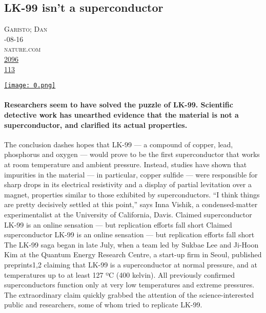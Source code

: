 \documentclass[10pt,a4paper]{article}
\begin{document}
\subsection{LK-99 isn’t a superconductor}
\noindent\begin{minipage}[t]{0.20\linewidth}
\vspace{0pt}
\noindent\textsc{\footnotesize
{\scriptsize\faUser}\space 
Garisto; Dan \\
{\scriptsize\faCalendar}-08-16 \\
{\scriptsize\faGlobe}\space 
nature.com \\
{\scriptsize\faThumbsOUp}\space 
\href{http://news.ycombinator.com/item?id=37149349\&utm\_term=comment}{2096} \\
{\scriptsize\faComments}\space 
\href{http://news.ycombinator.com/item?id=37149349\&utm\_term=comment}{113} \\
}
\end{minipage} %
\begin{minipage}[t]{0.80\linewidth}
\vspace{0pt}
\begin{multicols}{2}

    \href{https://www.nature.com/articles/d41586-023-02585-7?utm\_source=hackernewsletter\&utm\_medium=email\&utm\_term=fav}{
        \texttt{[image: 0.png]}
    }
  
\paragraph{Researchers seem to have solved the puzzle of LK-99. Scientific detective work has unearthed evidence that the material is not a superconductor, and clarified its actual properties.}

The conclusion dashes hopes that LK-99 — a compound of copper, lead, phosphorus and oxygen — would prove to be the first superconductor that works at room temperature and ambient pressure. Instead, studies have shown that impurities in the material — in particular, copper sulfide — were responsible for sharp drops in its electrical resistivity and a display of partial levitation over a magnet, properties similar to those exhibited by superconductors.
“I think things are pretty decisively settled at this point,” says Inna Vishik, a condensed-matter experimentalist at the University of California, Davis.
Claimed superconductor LK-99 is an online sensation — but replication efforts fall short
Claimed superconductor LK-99 is an online sensation — but replication efforts fall short
The LK-99 saga began in late July, when a team led by Sukbae Lee and Ji-Hoon Kim at the Quantum Energy Research Centre, a start-up firm in Seoul, published preprints1,2 claiming that LK-99 is a superconductor at normal pressure, and at temperatures up to at least 127 ºC (400 kelvin). All previously confirmed superconductors function only at very low temperatures and extreme pressures.
The extraordinary claim quickly grabbed the attention of the science-interested public and researchers, some of whom tried to replicate LK-99.

\end{multicols}
\end{minipage}
\end{document}
